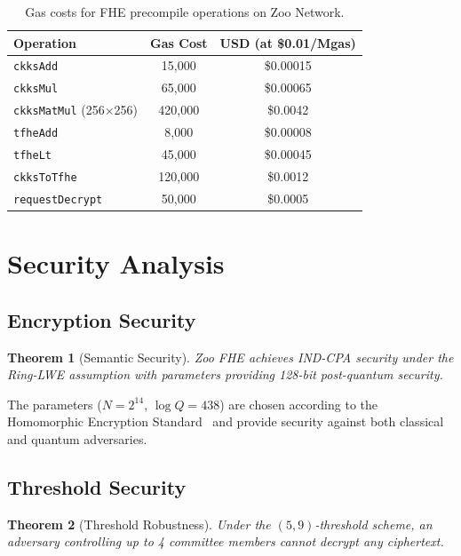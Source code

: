 \documentclass[11pt,letterpaper]{article}
\newtheorem{theorem}{Theorem}[section]
\begin{document}
\begin{table}[t]
\centering
\begin{tabular}{lcc}
\toprule
\textbf{Operation} & \textbf{Gas Cost} & \textbf{USD (at \$0.01/Mgas)} \\
\midrule
\texttt{ckksAdd} & 15,000 & \$0.00015 \\
\texttt{ckksMul} & 65,000 & \$0.00065 \\
\texttt{ckksMatMul} (256$\times$256) & 420,000 & \$0.0042 \\
\texttt{tfheAdd} & 8,000 & \$0.00008 \\
\texttt{tfheLt} & 45,000 & \$0.00045 \\
\texttt{ckksToTfhe} & 120,000 & \$0.0012 \\
\texttt{requestDecrypt} & 50,000 & \$0.0005 \\
\bottomrule
\end{tabular}
\caption{Gas costs for FHE precompile operations on Zoo Network.}
\label{tab:gas}
\end{table}

\section{Security Analysis}

\subsection{Encryption Security}

\begin{theorem}[Semantic Security]
Zoo FHE achieves IND-CPA security under the Ring-LWE assumption with parameters providing 128-bit post-quantum security.
\end{theorem}

The parameters ($N = 2^{14}$, $\log Q = 438$) are chosen according to the Homomorphic Encryption Standard~\cite{albrecht2018hes} and provide security against both classical and quantum adversaries.

\subsection{Threshold Security}

\begin{theorem}[Threshold Robustness]
Under the $(5, 9)$-threshold scheme, an adversary controlling up to 4 committee members cannot decrypt any ciphertext.
\end{theorem}
\end{document}
